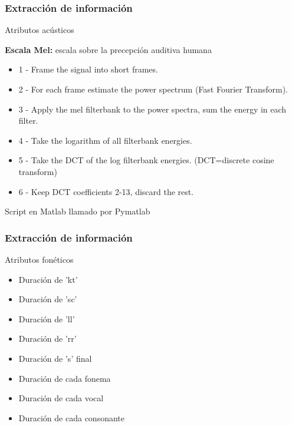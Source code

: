\documentclass[mathserif]{beamer}%
\begin{document}
\begin{frame}
\begin{figure}[H]
		\end{figure}
\end{frame}

\begin{frame}
	\frametitle{Extracción de información}
	\Large {Atributos acústicos}
	
	{\normalsize \textbf{Escala Mel:} escala sobre la precepción auditiva humana
	
	\begin{itemize}
		\item 1 - Frame the signal into short frames.
		\item 2 - For each frame estimate the power spectrum (Fast Fourier Transform).
		\item 3 - Apply the mel filterbank to the power spectra, sum the energy in each filter.
		\item 4 - Take the logarithm of all filterbank energies.
		\item 5 - Take the DCT of the log filterbank energies. (DCT=discrete cosine transform)
		\item 6 - Keep DCT coefficients 2-13, discard the rest.
	\end{itemize}
	
	Script en Matlab llamado por Pymatlab
	
	}
\end{frame}

\begin{frame}
	\frametitle{Extracción de información}
	\Large {Atributos fonéticos}
	
	\begin{itemize}
		\item Duración de 'kt'
		\item Duración de 'sc'
		\item Duración de 'll'
		\item Duración de 'rr'
		\item Duración de 's' final
		\item Duración de cada fonema
		\item Duración de cada vocal 
		\item Duración de cada consonante
	\end{itemize}
\end{frame}
\end{document}
